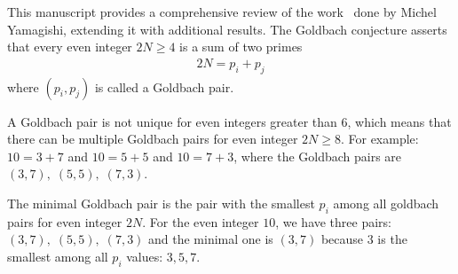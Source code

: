 This manuscript provides a comprehensive review of the work~\cite{yamagishi2025goldbach} done by Michel Yamagishi,
extending it with additional results.
The Goldbach conjecture asserts that every even integer $2N \geq 4$ is a sum of two primes
\begin{align*}
    2N = p_i + p_j
\end{align*}
where $(p_i, p_j)$ is called a Goldbach pair.

A Goldbach pair is not unique for even integers greater than 6,
which means that there can be multiple Goldbach pairs for even integer $2N \geq 8$.
For example: $10=3+7$ and $10=5+5$ and $10=7+3$, where the Goldbach pairs are $(3,7), \; (5,5), \; (7,3)$.

The minimal Goldbach pair is the pair with the smallest $p_i$ among all goldbach pairs for even integer $2N$.
For the even integer $10$, we have three pairs: $(3,7), \; (5,5), \; (7,3)$
and the minimal one is $(3,7)$ because
$3$ is the smallest among all $p_i$ values: $3, 5, 7$.


